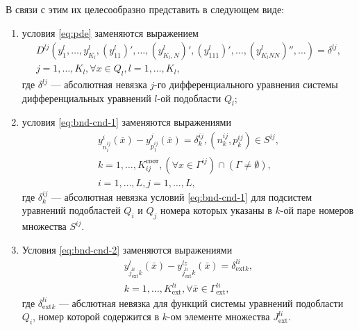 \documentclass[a4paper,12pt]{article}
\begin{document}
В связи с этим их целесообразно представить в следующем виде:
\begin{enumerate}[label=\alph*)]
    \item условия \eqref{eq:pde} заменяются выражением
        \begin{equation}
            \begin{array}{cc}
                D^{lj}(y^l_1,\ldots,y^l_{K_l}, (y^l_{11})',\ldots,
                (y^l_{K_l,N})', (y^l_{111})',\ldots,
                (y^l_{K_lNN})'',\ldots) = \delta^{lj},\\
                j = 1,\ldots,K_l, \forall x \in Q_l, l=1,\ldots, K_l,
            \end{array}
            \label{eq:pde_upd}
        \end{equation}
        где $\delta^{lj}$ --- абсолютная невязка $j$-го дифференциального
        уравнения системы дифференциальных уравнений $l$-ой подобласти
        $Q_l$;
    \item условия \eqref{eq:bnd-cnd-1} заменяются выражениями
        \begin{equation}
            \begin{array}{cc}
                y^i_{n^{ij}_i}(\bar{x})-y^j_{p^{ij}_1}(\bar{x})=
                \delta^{ij}_k,(n^{ij}_k,p^{ij}_k) \in S^{ij},\\
                k=1,\ldots,K^{соот}_{ij},
                \left( \forall x \in \Gamma^{ij} \right) \cap 
                \left( \Gamma \neq \emptyset \right),\\
                i=1,\ldots,L,j=1,\ldots,L,
            \end{array}
            \label{eq:bnd-cnd-upd-1}
        \end{equation}
        где $\delta^{ij}_k$ --- абсолютная невязка условий 
        \eqref{eq:bnd-cnd-1} для подсистем уравнений подобластей $Q_i$ и 
        $Q_j$ номера которых указаны в $k$-ой паре номеров множества 
        $S^{ij}$.
    \item Условия \eqref{eq:bnd-cnd-2} заменяются выражениями
        \begin{equation}
            \begin{array}{cc}
                y^l_{j^{li}_{\text{ext} }k}(\bar{x})-
                y^{lz}_{j^{li}_{\text{ext} }k}(\bar{x})=\delta^{li}_{\text{ext} k},\\
                k=1,\ldots,K^{li}_{\text{ext}},\forall \bar{x} \in 
                \Gamma^{li}_{\text{ext}},
            \end{array}
            \label{eq:bnd-cnd-upd-2}
        \end{equation}
        где $\delta^{li}_{\text{ext} k}$ --- абслютная невязка для функций 
        системы уравнений подобласти $Q_i$, номер которой содержится
        в $k$-ом элементе множества $J^{li}_{\text{ext}}$.
            
\end{enumerate}
\end{document}

